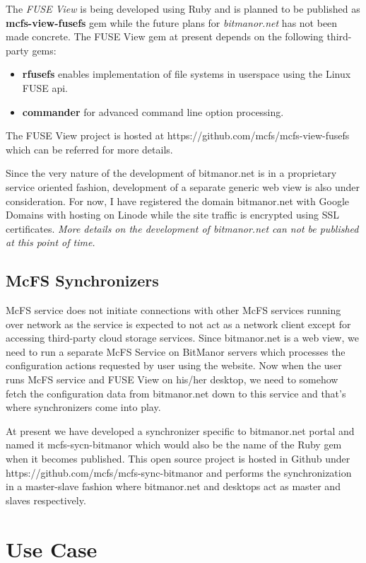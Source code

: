 The \emph{FUSE View} is being developed using Ruby and is planned to be published as \textbf{mcfs-view-fusefs} gem while the future plans for \emph{bitmanor.net} has not been made concrete. The FUSE View gem at present depends on the following third-party gems:

\begin{itemize}
	\item \textbf{rfusefs} enables implementation of file systems in userspace using the Linux FUSE api.
	\item \textbf{commander} for advanced command line option processing.
\end{itemize}

The FUSE View project is hosted at https://github.com/mcfs/mcfs-view-fusefs which can be referred for more details.

Since the very nature of the development of bitmanor.net is in a proprietary service oriented fashion, development of a separate generic web view is also under consideration. For now, I have registered the domain bitmanor.net with Google Domains with hosting on Linode while the site traffic is encrypted using SSL certificates. \emph{More details on the development of bitmanor.net can not be published at this point of time.}

\subsection{McFS Synchronizers}
McFS service does not initiate connections with other McFS services running over network as the service is expected to not act as a network client except for accessing third-party cloud storage services. Since bitmanor.net is a web view, we need to run a separate McFS Service on BitManor servers which processes the configuration actions requested by user using the website. Now when the user runs McFS service and FUSE View on his/her desktop, we need to somehow fetch the configuration data from bitmanor.net down to this service and that's where synchronizers come into play.

At present we have developed a synchronizer specific to bitmanor.net portal and named it mcfs-sycn-bitmanor which would also be the name of the Ruby gem when it becomes published. This open source project is hosted in Github under https://github.com/mcfs/mcfs-sync-bitmanor and performs the synchronization in a master-slave fashion where bitmanor.net and desktops act as master and slaves respectively.

\section{Use Case}


